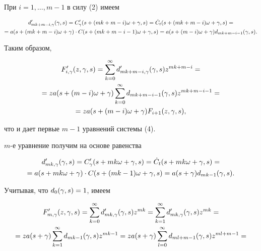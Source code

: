 \begin{pf} При $i=1,\dots,m-1$ в силу (2) имеем


\begin{gather*}


d'_{{mk+m-i},\g}(\g,s)=C'_\g(s+(mk+m-i)\omega+\g,s)=


\dot C_t(s+(mk+m-i)\omega+\g,s)=\\


=a(s+(mk+m-i)\omega+\g)\cdot C(s+(mk+m-i-1)\omega+\g,s)=


a(s+(m-i)\omega+\g)d_{mk+m-i-1}(\g,s).


\end{gather*}


Таким образом,


\begin{gather*}


F'_{i,\g}(z,\g,s)=


\sum_{k=0}^\infty d'_{mk+m-i,\g}(\g,s)z^{mk+m-i}=\\


=za(s+(m-i)\omega+\g)\sum_{k=0}^\infty d_{mk+m-i-1}(\g,s)z^{mk+m-i-1}=\\


=za(s+(m-i)\omega+\g)F_{i+1}(z,\g,s),


\end{gather*}


что и дает первые $m-1$ уравнений системы (4).


$m$-е уравнение получим на основе равенства


\begin{gather*}


d'_{{mk},\g}(\g,s)=C'_\g(s+mk\omega+\g,s)=


\dot C_t(s+mk\omega+\g,s)=\\


=a(s+mk\omega+\g)\cdot C(s+(mk-1)\omega+\g,s)=a(s+\g)d_{mk-1}(\g,s).


\end{gather*}


Учитывая, что $d_0(\gamma,s)=1$, имеем


\begin{gather*}


F'_{m,\g}(z,\g,s)=\sum_{k=0}^\infty d'_{mk,\g}(\g,s)z^{mk}=


\sum_{k=1}^\infty d'_{mk,\g}(\g,s)z^{mk}=\\


=za(s+\g)\sum_{k=1}^\infty d_{mk-1}(\g,s)z^{mk-1}=


za(s+\g)\sum_{l=0}^\infty d_{ml+m-1}(\g,s)z^{ml+m-1}=



\end{gather*}
\end{pf}

